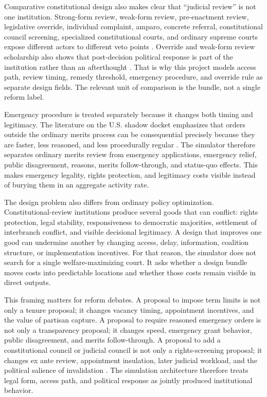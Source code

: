 \documentclass[
    journal=jlc,
    manuscript=research-article,
    year=2026,
  ]{cup-journal}
\newcommand{\jlcite}[1]{\autocite{#1}}
\newcommand{\jlcite}[1]{\citep{#1}}
\begin{document}
Comparative constitutional design also makes clear that ``judicial review'' is not one institution. Strong-form review, weak-form review, pre-enactment review, legislative override, individual complaint, amparo, concrete referral, constitutional council screening, specialized constitutional courts, and ordinary supreme courts expose different actors to different veto points \jlcite{Tushnet2008,Gardbaum2013,StoneSweet2000,BrewerCarias2009,KommersMiller2012}. Override and weak-form review scholarship also shows that post-decision political response is part of the institution rather than an afterthought \jlcite{HoggBushell1997,FerreresComella2009}. That is why this project models access path, review timing, remedy threshold, emergency procedure, and override rule as separate design fields. The relevant unit of comparison is the bundle, not a single reform label.

Emergency procedure is treated separately because it changes both timing and legitimacy. The literature on the U.S. shadow docket emphasizes that orders outside the ordinary merits process can be consequential precisely because they are faster, less reasoned, and less procedurally regular \jlcite{Baude2015,Vladeck2023,ShadowDocketDatabase2025}. The simulator therefore separates ordinary merits review from emergency applications, emergency relief, public disagreement, reasons, merits follow-through, and status-quo effects. This makes emergency legality, rights protection, and legitimacy costs visible instead of burying them in an aggregate activity rate.

The design problem also differs from ordinary policy optimization. Constitutional-review institutions produce several goods that can conflict: rights protection, legal stability, responsiveness to democratic majorities, settlement of interbranch conflict, and visible decisional legitimacy. A design that improves one good can undermine another by changing access, delay, information, coalition structure, or implementation incentives. For that reason, the simulator does not search for a single welfare-maximizing court. It asks whether a design bundle moves costs into predictable locations and whether those costs remain visible in direct outputs.

This framing matters for reform debates. A proposal to impose term limits is not only a tenure proposal; it changes vacancy timing, appointment incentives, and the value of partisan capture. A proposal to require reasoned emergency orders is not only a transparency proposal; it changes speed, emergency grant behavior, public disagreement, and merits follow-through. A proposal to add a constitutional council or judicial council is not only a rights-screening proposal; it changes ex ante review, appointment insulation, later judicial workload, and the political salience of invalidation \jlcite{GaroupaGinsburg2009}. The simulation architecture therefore treats legal form, access path, and political response as jointly produced institutional behavior.
\end{document}
